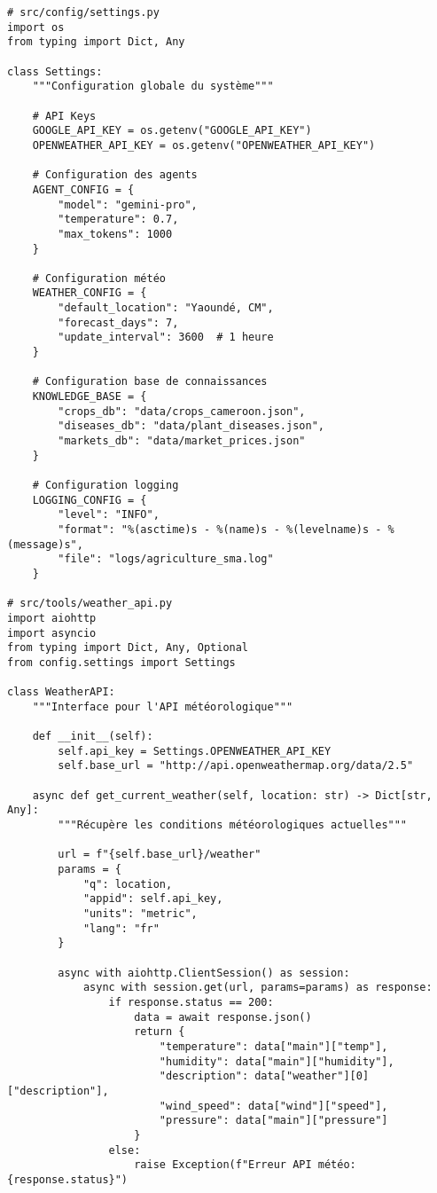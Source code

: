 \begin{verbatim}
# src/config/settings.py
import os
from typing import Dict, Any

class Settings:
    """Configuration globale du système"""

    # API Keys
    GOOGLE_API_KEY = os.getenv("GOOGLE_API_KEY")
    OPENWEATHER_API_KEY = os.getenv("OPENWEATHER_API_KEY")

    # Configuration des agents
    AGENT_CONFIG = {
        "model": "gemini-pro",
        "temperature": 0.7,
        "max_tokens": 1000
    }

    # Configuration météo
    WEATHER_CONFIG = {
        "default_location": "Yaoundé, CM",
        "forecast_days": 7,
        "update_interval": 3600  # 1 heure
    }

    # Configuration base de connaissances
    KNOWLEDGE_BASE = {
        "crops_db": "data/crops_cameroon.json",
        "diseases_db": "data/plant_diseases.json",
        "markets_db": "data/market_prices.json"
    }

    # Configuration logging
    LOGGING_CONFIG = {
        "level": "INFO",
        "format": "%(asctime)s - %(name)s - %(levelname)s - %(message)s",
        "file": "logs/agriculture_sma.log"
    }

# src/tools/weather_api.py
import aiohttp
import asyncio
from typing import Dict, Any, Optional
from config.settings import Settings

class WeatherAPI:
    """Interface pour l'API météorologique"""

    def __init__(self):
        self.api_key = Settings.OPENWEATHER_API_KEY
        self.base_url = "http://api.openweathermap.org/data/2.5"

    async def get_current_weather(self, location: str) -> Dict[str, Any]:
        """Récupère les conditions météorologiques actuelles"""

        url = f"{self.base_url}/weather"
        params = {
            "q": location,
            "appid": self.api_key,
            "units": "metric",
            "lang": "fr"
        }

        async with aiohttp.ClientSession() as session:
            async with session.get(url, params=params) as response:
                if response.status == 200:
                    data = await response.json()
                    return {
                        "temperature": data["main"]["temp"],
                        "humidity": data["main"]["humidity"],
                        "description": data["weather"][0]["description"],
                        "wind_speed": data["wind"]["speed"],
                        "pressure": data["main"]["pressure"]
                    }
                else:
                    raise Exception(f"Erreur API météo: {response.status}")


\end{verbatim}
